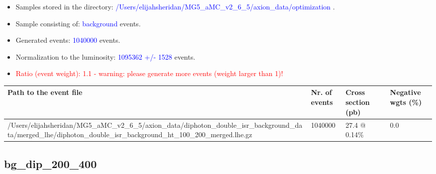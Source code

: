 \documentclass[a4paper, 10pt]{article}
\begin{document}
\begin{itemize}
  \item Samples stored in the directory: \textcolor{blue}{/\-Users/\-elijahsheridan/\-MG5\_aMC\_v2\_6\_5/\-axion\_data/\-optimization} .
   \item Sample consisting of: \textcolor{blue}{background}  events.
   \item Generated events: \textcolor{blue}{1040000 }  events.
   \item Normalization to the luminosity: \textcolor{blue}{1095362}\textcolor{blue}{ +/\-- }\textcolor{blue}{1528 }  events.
   \item\textcolor{red}{Ratio (event weight): }\textcolor{red}{1.1 }\textcolor{red}{ - warning: please generate more events (weight larger than 1)!}
\textcolor{red}{}
\end{itemize}
\begin{table}[H]
  \begin{center}
    \begin{tabular}{|m{55.0mm}|m{25.0mm}|m{30.0mm}|m{30.0mm}|}
      \hline
      {\cellcolor{yellow}         Path to the event file}& {\cellcolor{yellow}         Nr. of events}& {\cellcolor{yellow}         Cross section (pb)}& {\cellcolor{yellow}         Negative wgts (\%)}\\
      \hline
      {\cellcolor{white}          /\-Users/\-elijahsheridan/\-MG5\_aMC\_v2\_6\_5/\-axion\_data/\-diphoton\_double\_isr\_background\_data/\-merged\_lhe/\-diphoton\_double\_isr\_background\_ht\_100\_200\_merged.lhe.gz}& {\cellcolor{white}          1040000}& {\cellcolor{white}          27.4 @ 0.14\%}& {\cellcolor{white}          0.0}\\
\hline
    \end{tabular}
  \end{center}
\end{table}

\subsection{ bg\_dip\_200\_400}
\end{document}
